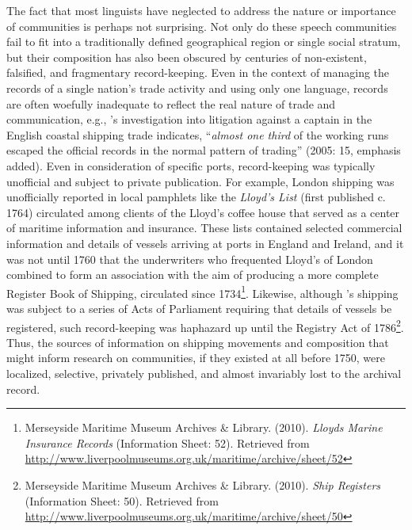 The fact that most linguists have neglected to address the nature or importance of  communities is perhaps not surprising. Not only do these speech communities fail to fit into a traditionally defined geographical region or single social stratum, but their composition has also been obscured by centuries of non-existent, falsified, and fragmentary record-keeping. Even in the context of managing the records of a single nation’s trade activity and using only one language, records are often woefully inadequate to reflect the real nature of trade and communication, e.g., \citeauthor{Cook2005}’s investigation into  litigation against a captain in the English coastal shipping trade indicates, “\textit{almost one third} of the working runs escaped the official records in the normal pattern of trading” (2005: 15, emphasis added). Even in consideration of specific ports, record-keeping was typically unofficial and subject to private publication. For example, London shipping was unofficially reported in local pamphlets like the \textit{Lloyd's List} (first published c. 1764) circulated among clients of the Lloyd’s coffee house that served as a center of maritime information and insurance. These lists contained selected commercial information and details of vessels arriving at ports in England and Ireland, and it was not until 1760 that the underwriters who frequented Lloyd’s of London combined to form an association with the aim of producing a more complete Register Book of Shipping, circulated since 1734\footnote{Merseyside Maritime Museum Archives \& Library. (2010).  \textit{Lloyds Marine Insurance Records} (Information Sheet: 52). Retrieved from \url{http://www.liverpoolmuseums.org.uk/maritime/archive/sheet/52}}. Likewise, although ’s shipping was subject to a series of Acts of Parliament requiring that details of vessels be registered, such record-keeping was haphazard up until the Registry Act of 1786\footnote{Merseyside Maritime Museum Archives \& Library. (2010).  \textit{ Ship Registers} (Information Sheet: 50). Retrieved from \url{http://www.liverpoolmuseums.org.uk/maritime/archive/sheet/50}}. Thus, the sources of information on shipping movements and  composition that might inform research on  communities, if they existed at all before 1750, were localized, selective, privately published, and almost invariably lost to the archival record. 

